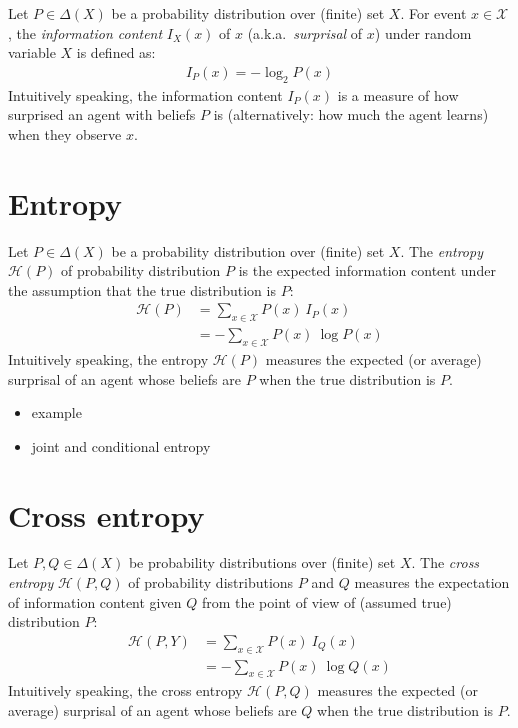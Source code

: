 \documentclass[nobib,nofonts]{tufte-handout}
\begin{document}
Let $P\in \Delta(X)$ be a probability distribution over (finite) set $X$.
For event $x \in \mathcal{X}$, the \emph{information content} $I_{X}(x)$ of $x$ (a.k.a.~\emph{surprisal} of $x$) under random variable $X$ is defined as:
\begin{align*}
  I_{P}(x) = - \log_{2} P(x)
\end{align*}
Intuitively speaking, the information content $I_{P}(x)$ is a measure of how surprised an agent with beliefs $P$ is (alternatively: how much the agent learns) when they observe $x$.

\section{Entropy}

Let $P\in \Delta(X)$ be a probability distribution over (finite) set $X$.
The \emph{entropy} $\mathcal{H}(P)$ of probability distribution $P$ is the expected information content under the assumption that the true distribution is $P$:
\begin{align*}
  \mathcal{H}(P) & = \sum_{x \in \mathcal{X}} P(x) \ I_{P}(x) \\
                 & = - \sum_{x \in \mathcal{X}} P(x) \ \log P(x)
\end{align*}
Intuitively speaking, the entropy $\mathcal{H}(P)$ measures the expected (or average) surprisal of an agent whose beliefs are $P$ when the true distribution is $P$.

\begin{itemize}
  \item example
  \item joint and conditional entropy
\end{itemize}

\section{Cross entropy}

Let $P, Q \in \Delta(X)$ be probability distributions over (finite) set $X$.
The \emph{cross entropy} $\mathcal{H}(P,Q)$ of probability distributions $P$ and $Q$ measures the expectation of information content given $Q$ from the point of view of (assumed true) distribution $P$:
\begin{align*}
  \mathcal{H}(P,Y) & = \sum_{x \in \mathcal{X}} P(x) \ I_{Q}(x) \\
                   & = - \sum_{x \in \mathcal{X}} P(x) \ \log Q(x)
\end{align*}
Intuitively speaking, the cross entropy $\mathcal{H}(P,Q)$ measures the expected (or average) surprisal of an agent whose beliefs are $Q$ when the true distribution is $P$.
\end{document}
